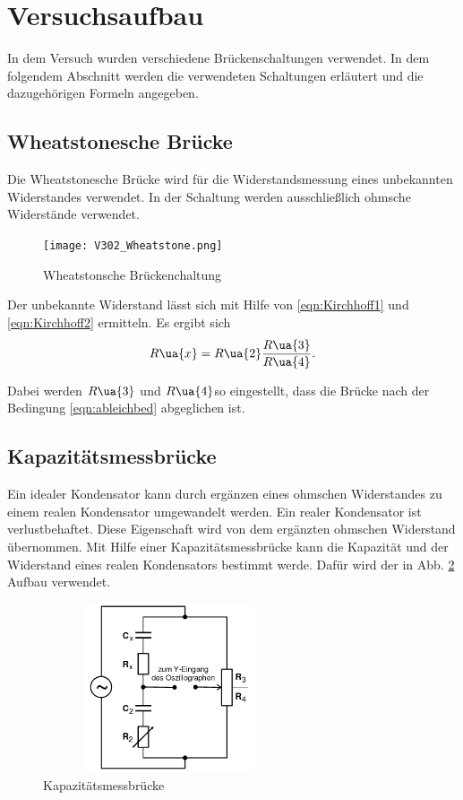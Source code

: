 \section{Versuchsaufbau}

In dem Versuch wurden verschiedene Brückenschaltungen verwendet. In dem folgendem
Abschnitt werden die verwendeten Schaltungen erläutert und die dazugehörigen
Formeln angegeben.

\subsection{Wheatstonesche Brücke}

Die Wheatstonesche Brücke wird für die Widerstandsmessung eines unbekannten
Widerstandes verwendet. In der Schaltung werden ausschließlich ohmsche Widerstände
verwendet.

\begin{figure}
  \texttt{[image: V302\_Wheatstone.png]}
  \caption{Wheatstonsche Brückenchaltung}
  \label{fig:Wheatstone}
\end{figure}
Der unbekannte Widerstand lässt sich mit Hilfe von \eqref{eqn:Kirchhoff1} und
\eqref{eqn:Kirchhoff2} ermitteln. Es ergibt sich
\begin{equation}
  \label{eqn:Wheatstone}
  R\ua{x} = R\ua{2}\frac{R\ua{3}}{R\ua{4}}.
\end{equation}

Dabei werden $R\ua{3}$ und $R\ua{4}$so eingestellt, dass die Brücke nach
der Bedingung \eqref{eqn:ableichbed} abgeglichen ist.

\subsection{Kapazitätsmessbrücke}

Ein idealer Kondensator kann durch ergänzen eines ohmschen Widerstandes zu einem
realen Kondensator umgewandelt werden. Ein realer Kondensator ist verlustbehaftet.
Diese Eigenschaft wird von dem ergänzten ohmschen Widerstand übernommen.
Mit Hilfe einer Kapazitätsmessbrücke kann die Kapazität und der Widerstand eines
realen Kondensators bestimmt werde.
Dafür wird der in Abb. \ref{fig:Kapazitätsmessbrücke} Aufbau verwendet.

\begin{figure}
  \includegraphics[width=7.50cm, height=5cm]{V302_Kapazitätsmessbrücke.png}
  \caption{Kapazitätsmessbrücke}
  \label{fig:Kapazitätsmessbrücke}
\end{figure}

